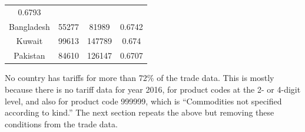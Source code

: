 \documentclass[10pt,]{article}
\begin{document}
\begin{longtable}[]{@{}cccc@{}}
\begin{minipage}[t]{0.18\columnwidth}
0.6793\strut
\end{minipage}\tabularnewline
\begin{minipage}[t]{0.26\columnwidth}\centering\strut
Bangladesh\strut
\end{minipage} & \begin{minipage}[t]{0.12\columnwidth}\centering\strut
55277\strut
\end{minipage} & \begin{minipage}[t]{0.10\columnwidth}\centering\strut
81989\strut
\end{minipage} & \begin{minipage}[t]{0.18\columnwidth}\centering\strut
0.6742\strut
\end{minipage}\tabularnewline
\begin{minipage}[t]{0.26\columnwidth}\centering\strut
Kuwait\strut
\end{minipage} & \begin{minipage}[t]{0.12\columnwidth}\centering\strut
99613\strut
\end{minipage} & \begin{minipage}[t]{0.10\columnwidth}\centering\strut
147789\strut
\end{minipage} & \begin{minipage}[t]{0.18\columnwidth}\centering\strut
0.674\strut
\end{minipage}\tabularnewline
\begin{minipage}[t]{0.26\columnwidth}\centering\strut
Pakistan\strut
\end{minipage} & \begin{minipage}[t]{0.12\columnwidth}\centering\strut
84610\strut
\end{minipage} & \begin{minipage}[t]{0.10\columnwidth}\centering\strut
126147\strut
\end{minipage} & \begin{minipage}[t]{0.18\columnwidth}\centering\strut
0.6707\strut
\end{minipage}\tabularnewline
\bottomrule
\end{longtable}

No country has tariffs for more than 72\% of the trade data. This is
mostly because there is no tariff data for year 2016, for product codes
at the 2- or 4-digit level, and also for product code 999999, which is
``Commodities not specified according to kind.'' The next section
repeats the above but removing these conditions from the trade data.
\end{document}

